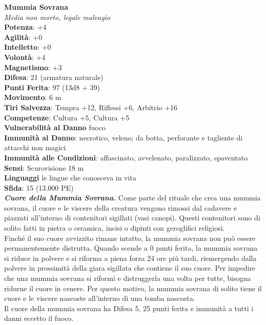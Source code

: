 \begin{multicols}{2}
\medskip\textbf{Mummia Sovrana}\\
\emph{Media non morto, legale malvagio}\\
\textbf{Potenza}: +4\\
\textbf{Agilità}: +0\\
\textbf{Intelletto}: +0\\
\textbf{Volontà}: +4\\
\textbf{Magnetismo}: +3\\
\textbf{Difesa}: 21 (armatura naturale)\\
\textbf{Punti Ferita}: 97 (13d8 + 39)\\
\textbf{Movimento}: 6 m\\
\textbf{Tiri Salvezza}: Tempra +12, Riflessi +6, Arbitrio +16\\
\textbf{Competenze}: Cultura +5, Cultura +5\\
\textbf{Vulnerabilità al Danno} fuoco\\
\textbf{Immunità al Danno}: necrotico, veleno; da botta, perforante e tagliente di attacchi non magici\\
\textbf{Immunità alle Condizioni}: affascinato, avvelenato, paralizzato, spaventato\\
\textbf{Sensi}: Scurovisione 18 m\\
\textbf{Linguaggi} le lingue che conosceva in vita\\
\textbf{Sfida}: 15 (13.000 PE)\smallskip\\

\emph{\textbf{Cuore della Mummia Sovrana.}} Come parte del rituale che crea una mummia sovrana, il cuore e le viscere della creatura vengono rimossi dal cadavere e piazzati all'interno di contenitori sigillati (vasi canopi). Questi contenitori sono di solito fatti in pietra o ceramica, incisi o dipinti con geroglifici religiosi.\\

Finché il suo cuore avvizzito rimane intatto, la mummia sovrana non può essere permanentemente distrutta. Quando scende a 0 punti ferita, la mummia sovrana si riduce in polvere e si riforma a piena forza 24 ore più tardi, riemergendo dalla polvere in prossimità della giara sigillata che contiene il suo cuore. Per impedire che una mummia sovrana si riformi e distruggerla una volta per tutte, bisogna ridurne il cuore in cenere. Per questo motivo, la mummia sovrana di solito tiene il cuore e le viscere nascoste all'interno di una tomba nascosta.\\
Il cuore della mummia sovrana ha Difesa 5, 25 punti ferita e immunità a tutti i danni eccetto il fuoco.


\end{multicols}
